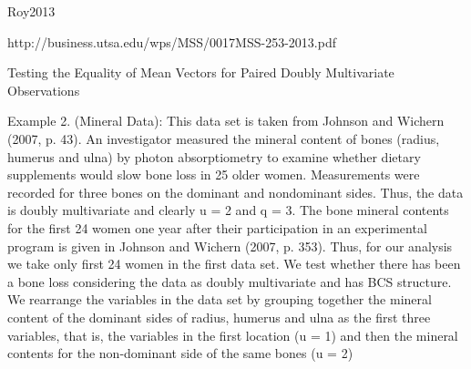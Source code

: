 Roy2013

http://business.utsa.edu/wps/MSS/0017MSS-253-2013.pdf


Testing the Equality of Mean Vectors for Paired Doubly Multivariate Observations 


Example 2. (Mineral Data): This data set is taken from Johnson and Wichern (2007, p. 43).
An investigator measured the mineral content of bones (radius, humerus and ulna) by photon
absorptiometry to examine whether dietary supplements would slow bone loss in 25 older women.
Measurements were recorded for three bones on the dominant and nondominant sides. Thus,
the data is doubly multivariate and clearly u = 2 and q = 3.
The bone mineral contents for the ﬁrst 24 women one year after their participation in an
experimental program is given in Johnson and Wichern (2007, p. 353). Thus, for our analysis
we take only ﬁrst 24 women in the ﬁrst data set. We test whether there has been a bone loss
considering the data as doubly multivariate and has BCS structure. We rearrange the variables
in the data set by grouping together the mineral content of the dominant sides of radius, humerus
and ulna as the ﬁrst three variables, that is, the variables in the ﬁrst location (u = 1) and then
the mineral contents for the non-dominant side of the same bones (u = 2)
